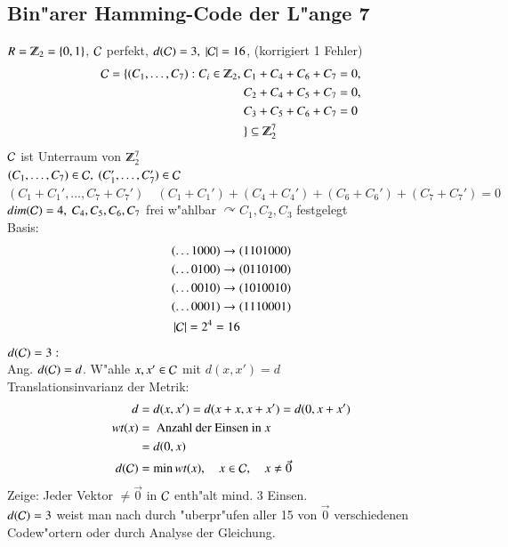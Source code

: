 \subsection{Bin"arer Hamming-Code der L"ange 7}

$R=\Z_2=\lbrace 0,1 \rbrace$, $\mathcal{C}$ perfekt, $d(\mathcal{C})=3,\ \left| \mathcal{C} \right| = 16$, (korrigiert 1 Fehler)
\begin{align*}
	\Code = \lbrace (C_1,\ldots,C_7) : C_i \in \Z_2,\
		&C_1 + C_4 + C_6 + C_7 = 0,\\
		&C_2 + C_4 + C_5 + C_7 = 0,\\
		&C_3 + C_5 + C_6 + C_7 = 0\\
		&\rbrace \subseteq \Z_2^7
\end{align*}
$\mathcal{C}$ ist Unterraum von $\Z_2^7$ \\
$(C_1,\ldots,C_7) \in \Code,\ (C_1',\ldots,C_7') \in \Code$ \\
$(C_1 + C_1',\ldots,C_7+C_7')\quad (C_1+C_1') + (C_4+C_4') + (C_6+C_6') + (C_7+C_7') = 0$ \\
$dim(\mathcal{C})=4,\ C_4,C_5,C_6,C_7$ frei w"ahlbar $\curvearrowright C_1,C_2,C_3$ festgelegt \\
Basis:
\begin{align*}
	&(\ldots 1000) \rightarrow (1101000) \\
	&(\ldots 0100) \rightarrow (0110100) \\
	&(\ldots 0010) \rightarrow (1010010) \\
	&(\ldots 0001) \rightarrow (1110001) \\
	&\left| \mathcal{C} \right| =2^4 =16
\end{align*}
$d(\mathcal{C})=3:$\\
Ang. $d(\mathcal{C})=d$. W"ahle $x,x' \in \mathcal{C}$ mit $d(x,x')=d$\\
Translationsinvarianz der Metrik: \\
\begin{align*}
	d &=d(x,x')=d(x+x,x+x')=d(0,x+x') \\
	wt(x) &= \text{ Anzahl der Einsen in } x \\
	&= d(0,x)\\
	d(\mathcal{C}) &= \min wt(x),\quad x \in \mathcal{C},\quad x \neq \vec{0}
\end{align*}
Zeige: Jeder Vektor $\neq \vec{0}$ in $\mathcal{C}$ enth"alt mind. 3 Einsen.\\
$d(\mathcal{C}) = 3$ weist man nach durch "uberpr"ufen aller 15 von $\vec{0}$ verschiedenen Codew"ortern oder durch Analyse der Gleichung. 
